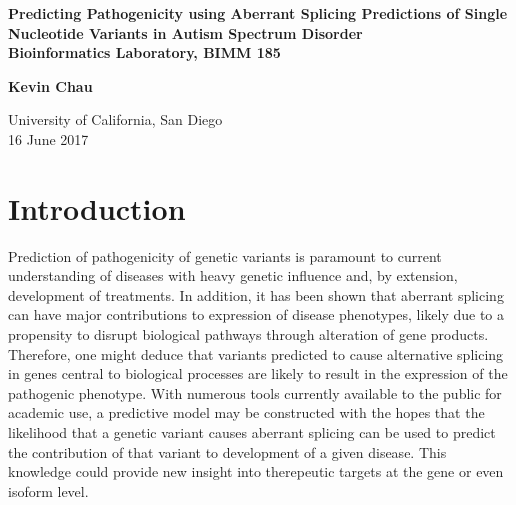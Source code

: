 \documentclass[12pt]{article}
\begin{document}
\lstset{style=output}
\setlength\parindent{0pt}

\begin{titlepage}
    \begin{center}
        \vspace*{1cm}

        \Huge
        \textbf{Predicting Pathogenicity using Aberrant Splicing Predictions of Single Nucleotide Variants in Autism Spectrum Disorder}\\


        \vspace{0.5cm}
        \Large
        \textbf{Bioinformatics Laboratory, BIMM 185}

        \vspace{1.5cm}
        \textbf{Kevin Chau}

        \vfill

        \Large
        University of California, San Diego\\
        16 June 2017
    \end{center}
\end{titlepage}


\pagebreak

\section{Introduction}
Prediction of pathogenicity of genetic variants is paramount to current 
understanding of diseases with heavy genetic influence and, by extension,
development of treatments. In addition, it has been shown that aberrant 
splicing can have major contributions to expression of disease phenotypes, 
likely due to a propensity to disrupt biological pathways through alteration 
of gene products. Therefore, one might deduce that variants 
predicted to cause alternative splicing in genes central to biological 
processes are likely to result in the expression of the pathogenic phenotype. 
With numerous tools currently available to the public for academic use, a 
predictive model may be constructed with the hopes that the likelihood that a 
genetic variant causes aberrant splicing can be used to predict the contribution 
of that variant to development of a given disease. This knowledge could provide 
new insight into therepeutic targets at the gene or even isoform level.
\end{document}
